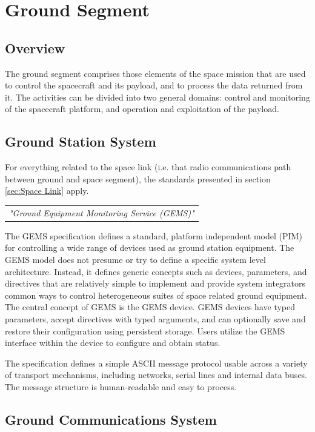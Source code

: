 \chapter{Ground Segment}

\section{Overview}

The ground segment comprises those elements of the space mission that are used to control the spacecraft and its payload, and to process the data returned from it. The activities can be divided into two general domains: control and monitoring of the spacecraft platform, and operation and exploitation of the payload.

\section{Ground Station System}

For everything related to the space link (i.e. that radio communications path between ground and space segment), the standards presented in section \ref{sec:Space Link} apply.

\begin{tabular}{l}
\textit{"Ground Equipment Monitoring Service (GEMS)" \cite{XXXXX}} \\
\end{tabular}

The GEMS specification defines a standard, platform independent model (PIM) for controlling a wide range of devices used as ground station equipment. The GEMS model does not presume or try to define a specific system level architecture. Instead, it defines generic concepts such as devices, parameters, and directives that are relatively simple to implement and provide system integrators common ways to control heterogeneous suites of space related ground equipment. The central concept of GEMS is the GEMS device. GEMS devices have typed parameters, accept directives with typed arguments, and can optionally save and restore their configuration using persistent storage. Users utilize the GEMS interface within the device to configure and obtain status.

The specification defines a simple ASCII message protocol usable across a variety of transport mechanisms, including networks, serial lines and internal data buses. The message structure is human-readable and easy to process.

\section{Ground Communications System}


